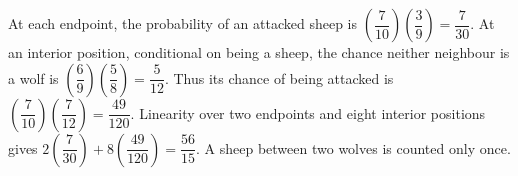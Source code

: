 At each endpoint, the probability of an attacked sheep is $(\dfrac{7}{10})(\dfrac{3}{9})=\dfrac{7}{30}$. At an interior position, conditional on being a sheep, the chance neither neighbour is a wolf is $(\dfrac{6}{9})(\dfrac{5}{8})=\dfrac{5}{12}$. Thus its chance of being attacked is $(\dfrac{7}{10})(\dfrac{7}{12})=\dfrac{49}{120}$. Linearity over two endpoints and eight interior positions gives $2(\dfrac{7}{30})+8(\dfrac{49}{120})=\boxed{\dfrac{56}{15}}$. A sheep between two wolves is counted only once.
